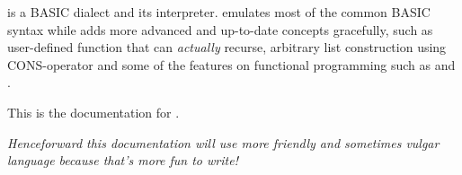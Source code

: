 \tbas{} is a BASIC dialect and its interpreter. \tbas emulates most of the common BASIC syntax while adds more advanced and up-to-date concepts gracefully, such as user-defined function that can \emph{actually} recurse, arbitrary list construction using CONS-operator and some of the features on functional programming such as  and .

This is the documentation for \tbas{} \tbasver{}.

\small\emph{Henceforward this documentation will use more friendly and sometimes vulgar language because that's more fun to write!}
